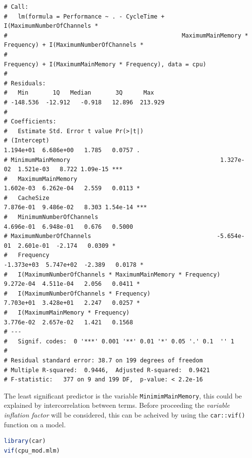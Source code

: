 \documentclass[
]{article}
\newcommand{\passthrough}[1]{#1}
\begin{document}
\begin{lstlisting}[basicstyle=\scriptsize \ttfamily]
# Call:
#   lm(formula = Performance ~ . - CycleTime + I(MaximumNumberOfChannels * 
#                                                  MaximumMainMemory * Frequency) + I(MaximumNumberOfChannels * 
#                                                                                       Frequency) + I(MaximumMainMemory * Frequency), data = cpu)
# 
# Residuals:
#   Min       1Q   Median       3Q      Max 
# -148.536  -12.912   -0.918   12.896  213.929 
# 
# Coefficients:
#   Estimate Std. Error t value Pr(>|t|)    
# (Intercept)                                                 1.194e+01  6.686e+00   1.785   0.0757 .  
# MinimumMainMemory                                           1.327e-02  1.521e-03   8.722 1.09e-15 ***
#   MaximumMainMemory                                           1.602e-03  6.262e-04   2.559   0.0113 *  
#   CacheSize                                                   7.876e-01  9.486e-02   8.303 1.54e-14 ***
#   MinimumNumberOfChannels                                     4.696e-01  6.948e-01   0.676   0.5000    
# MaximumNumberOfChannels                                    -5.654e-01  2.601e-01  -2.174   0.0309 *  
#   Frequency                                                  -1.373e+03  5.747e+02  -2.389   0.0178 *  
#   I(MaximumNumberOfChannels * MaximumMainMemory * Frequency)  9.272e-04  4.511e-04   2.056   0.0411 *  
#   I(MaximumNumberOfChannels * Frequency)                      7.703e+01  3.428e+01   2.247   0.0257 *  
#   I(MaximumMainMemory * Frequency)                            3.776e-02  2.657e-02   1.421   0.1568    
# ---
#   Signif. codes:  0 '***' 0.001 '**' 0.01 '*' 0.05 '.' 0.1  '' 1
# 
# Residual standard error: 38.7 on 199 degrees of freedom
# Multiple R-squared:  0.9446,	Adjusted R-squared:  0.9421 
# F-statistic:   377 on 9 and 199 DF,  p-value: < 2.2e-16
\end{lstlisting}

The least significant predictor is the variable
\passthrough{\lstinline!MinimimMainMemory!}, this could be explained by
intercorrelation between terms. Before proceeding the \emph{variable
inflation factor} will be considered, this can be acheived by using the
\passthrough{\lstinline!car::vif()!} function on a model.

\begin{lstlisting}[language=R]
library(car)
vif(cpu_mod.mlm)
\end{lstlisting}
\end{document}
